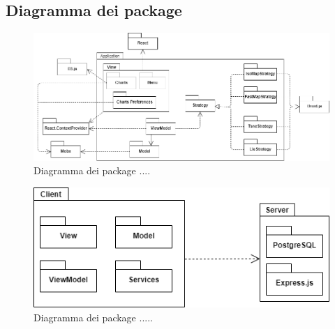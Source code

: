 \subsection{Diagramma dei package}
\begin{figure}[hb]
\includegraphics[width=18cm]{Images/Allegato Tecnico-Package}
\centering
\caption{Diagramma dei package ....}
\end{figure}
\begin{figure}[hb]
\includegraphics[width=12cm]{Images/Allegato Tecnico-Package 2}
\centering
\caption{Diagramma dei package .....}
\end{figure}
\newpage

